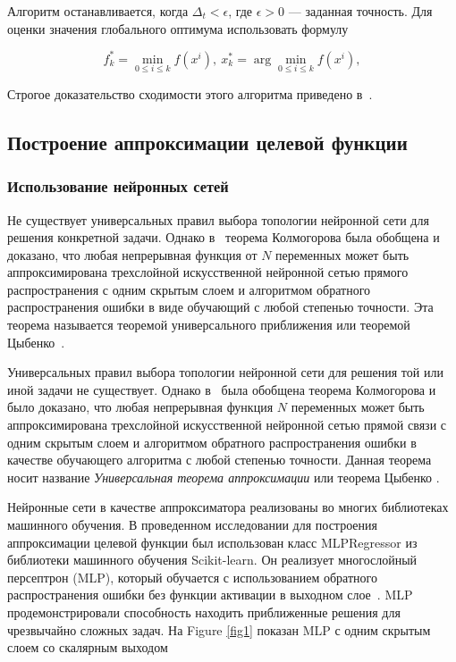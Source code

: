 \documentclass[mathematics,article,accept,pdftex,moreauthors]{Definitions/mdpi}
\begin{document}
Алгоритм останавливается, когда $\Delta_t<\epsilon$, где $\epsilon>0$ — заданная точность. Для оценки значения глобального оптимума использовать формулу
\begin{linenomath}
\begin{equation}
f_k^\ast=\min_{0\leq i \leq k}f(x^i), \ x_k^\ast=\arg \min_{0\leq i \leq k}f(x^i),
\end{equation}
\end{linenomath}

Строгое доказательство сходимости этого алгоритма приведено в~\cite{Strongin2000}.


\subsection{Построение аппроксимации целевой функции}

\subsubsection{Использование нейронных сетей}

Не существует универсальных правил выбора топологии нейронной сети для решения конкретной задачи. Однако в~\cite{Cybenko1989} теорема Колмогорова была обобщена и доказано, что любая непрерывная функция от $N$ переменных может быть аппроксимирована трехслойной искусственной нейронной сетью прямого распространения с одним скрытым слоем и алгоритмом обратного распространения ошибки в виде обучающий с любой степенью точности. Эта теорема называется теоремой универсального приближения или теоремой Цыбенко~\cite{Hassoun1995}.

Универсальных правил выбора топологии нейронной сети для решения той или иной задачи не существует. Однако в~\cite{Cybenko1989} была обобщена теорема Колмогорова и было доказано, что любая непрерывная функция $N$ переменных может быть аппроксимирована трехслойной искусственной нейронной сетью прямой связи с одним скрытым слоем и алгоритмом обратного распространения ошибки в качестве обучающего алгоритма с любой степенью точности. Данная теорема носит название \textit{Универсальная теорема аппроксимации} или теорема Цыбенко \cite{Hassoun1995}.

Нейронные сети в качестве аппроксиматора реализованы во многих библиотеках машинного обучения. 
В проведенном исследовании для построения аппроксимации целевой функции был использован класс MLPRegressor из библиотеки машинного обучения Scikit-learn. Он реализует многослойный персептрон (MLP), который обучается с использованием обратного распространения ошибки без функции активации в выходном слое~\cite{Nielsen1989}. MLP продемонстрировали способность находить приближенные решения для чрезвычайно сложных задач.
На Figure \ref{fig1} показан MLP с одним скрытым слоем со скалярным выходом
\end{document}
